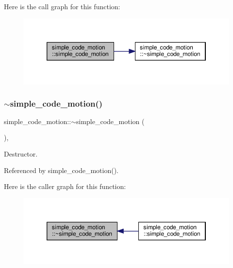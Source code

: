 Here is the call graph for this function\+:
\nopagebreak
\begin{figure}[H]
\begin{center}
\leavevmode
\includegraphics[width=346pt]{d5/d58/classsimple__code__motion_ad187a9fcaf94b18b0fa72c8725386d4b_cgraph}
\end{center}
\end{figure}
\mbox{\label{classsimple__code__motion_abb99083863cc83ac6bc24881a325b4a0}} 
\subsubsection{\texorpdfstring{$\sim$simple\+\_\+code\+\_\+motion()}{~simple\_code\_motion()}}
{\footnotesize\ttfamily simple\+\_\+code\+\_\+motion\+::$\sim$simple\+\_\+code\+\_\+motion (\begin{DoxyParamCaption}{ }\end{DoxyParamCaption})\hspace{0.3cm}{\ttfamily [override]}, {\ttfamily [default]}}



Destructor. 



Referenced by simple\+\_\+code\+\_\+motion().

Here is the caller graph for this function\+:
\nopagebreak
\begin{figure}[H]
\begin{center}
\leavevmode
\includegraphics[width=346pt]{d5/d58/classsimple__code__motion_abb99083863cc83ac6bc24881a325b4a0_icgraph}
\end{center}
\end{figure}


